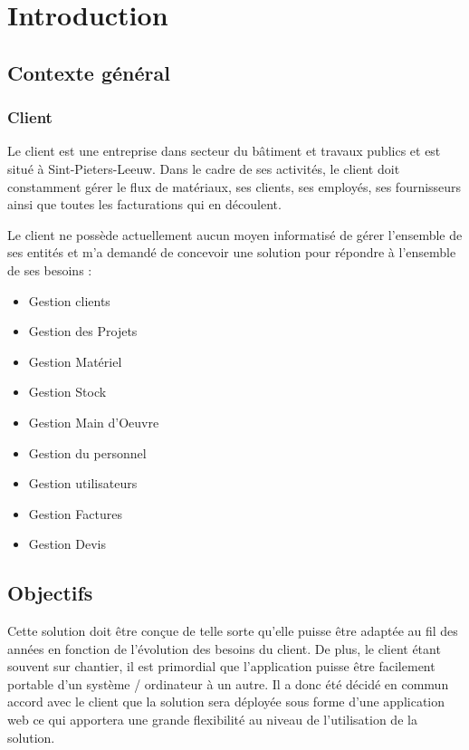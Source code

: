 \section{Introduction}
\subsection{Contexte général }
\subsubsection{Client}

Le client est une entreprise dans secteur du bâtiment et travaux publics et est situé à Sint-Pieters-Leeuw. Dans le cadre de ses activités, le client doit constamment gérer le flux de matériaux, ses clients, ses employés, ses fournisseurs ainsi que toutes les facturations qui en découlent.

Le client ne possède actuellement aucun moyen informatisé de gérer l'ensemble de ses entités et m'a demandé de concevoir une solution pour répondre à l'ensemble de ses besoins :

\begin{itemize}
  \item Gestion clients 
  \item Gestion des Projets
  \item Gestion Matériel
  \item Gestion Stock
  \item Gestion Main d'Oeuvre
  \item Gestion du personnel
  \item Gestion utilisateurs
  \item Gestion Factures
  \item Gestion Devis

\end{itemize}

\subsection{Objectifs }
Cette solution doit être conçue de telle sorte qu'elle puisse être adaptée au fil des années en fonction de l'évolution des besoins du client. 
De plus, le client étant souvent sur chantier, il est primordial que l'application puisse être facilement portable d'un système / ordinateur à un autre. Il a donc été décidé en commun accord avec le client que la solution sera déployée sous forme d'une application web ce qui apportera une grande flexibilité au niveau de l'utilisation de la solution.

